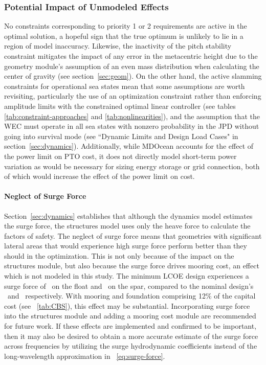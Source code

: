 \subsubsection{Potential Impact of Unmodeled Effects}
No constraints corresponding to priority 1 or 2 requirements are active in the optimal solution, %
a hopeful sign that the true optimum is unlikely to lie in a region of model inaccuracy.
Likewise, the inactivity of the pitch stability constraint mitigates the impact of any error in the metacentric height due to the geometry module's assumption of an even mass distribution when calculating the center of gravity (see section~\ref{sec:geom}).
On the other hand, the active slamming constraints for operational sea states mean that some assumptions are worth revisiting, particularly the use of an optimization constraint rather than enforcing amplitude limits with the constrained optimal linear controller (see tables \ref{tab:constraint-approaches} and \ref{tab:nonlinearities}), and the assumption that the WEC must operate in all sea states with nonzero probability in the JPD without going into survival mode (see ``Dynamic Limits and Design Load Cases" in section~\ref{sec:dynamics}).
Additionally, while MDOcean accounts for the effect of the power limit on PTO cost, it does not directly model short-term power variation as would be necessary for sizing energy storage or grid connection, both of which would increase the effect of the power limit on cost.

\paragraph{Neglect of Surge Force}
Section~\ref{sec:dynamics} establishes that although the dynamics model estimates the surge force, the structures model uses only the heave force to calculate the factors of safety.
The neglect of surge force means that geometries with significant lateral areas that would experience high surge force perform better than they should in the optimization.
This is not only because of the impact on the structures module, but also because the surge force drives mooring cost, an effect which is not modeled in this study.
The minimum LCOE design experiences a surge force of \surgeForceFloatAtMinLCOE~on the float and \surgeForceSparAtMinLCOE~on the spar, compared to the nominal design's \surgeForceFloatNominal~and \surgeForceSparNominal~respectively.
With mooring and foundation comprising 12\% of the capital cost (see \tableautorefname~\ref{tab:CBS}), this effect may be substantial.
Incorporating surge force into the structures module and adding a mooring cost module are recommended for future work.
If these effects are implemented and confirmed to be important, then it may also be desired to obtain a more accurate estimate of the surge force across frequencies by utilizing the surge hydrodynamic coefficients instead of the long-wavelength approximation in \equationautorefname~\ref{eq:surge-force}. 

